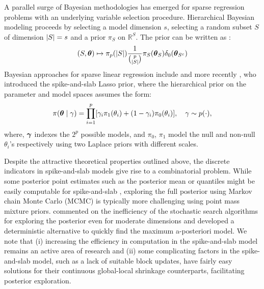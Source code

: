 \documentclass[11pt]{article}
\begin{document}
A parallel surge of Bayesian methodologies has emerged for sparse regression
problems with an underlying variable selection procedure. Hierarchical Bayesian
modeling proceeds by selecting a model dimension $s$, selecting a random subset
$S$ of dimension $\lvert S\rvert = s$ and a prior $\pi_S$ on $\mathbb{R}^{S}$. The
prior can be written as \cite{castillo2015bayesian}:
\begin{equation}
  (S,\boldsymbol{\theta}) \mapsto \pi_p(\lvert S\rvert) \frac{1}{\binom{p}{\lvert S\rvert}}
  \pi_S(\boldsymbol{\theta}_S)\delta_{0}(\boldsymbol{\theta}_{S^c}) \label{eq:bayes-hier}
\end{equation}
Bayesian approaches for sparse linear regression include
\citep{george2000variable,George0000, mitchell88, ishwaran2005spike} and more
recently \cite{rovckova2016spike}, who introduced the spike-and-slab Lasso
prior, where the hierarchical prior on the parameter and model spaces assumes
the form:
\begin{equation}
  \pi(\boldsymbol{\theta} \mid \gamma) = \prod_{i=1}^{p} [\gamma_i \pi_1(\theta_i) +
  (1-\gamma_i) \pi_0(\theta_i)], \quad \gamma \sim p(\cdot), \label{eq:ssl}
\end{equation}
where, $\boldsymbol{\gamma}$ indexes the $2^p$ possible models, and $\pi_0$, $\pi_1$ model
the null and non-null $\theta_i$'s respectively using two Laplace priors with
different scales. 

Despite the attractive theoretical properties outlined above, the discrete
indicators in spike-and-slab models give rise to a combinatorial problem. While
some posterior point estimates such as the posterior mean or quantiles might be
easily computable for spike-and-slab \citep{castillo2012needles,
castillo2015bayesian}, exploring the full posterior using Markov chain Monte
Carlo (MCMC) is typically more challenging using point mass mixture priors. 
\citet{rovckova2016spike} commented on the inefficiency of the stochastic
search algorithms for exploring the posterior even for moderate dimensions and
developed a deterministic alternative to quickly find the maximum a-posteriori
model. We note that (i) increasing the efficiency in computation in the
spike-and-slab model remains an active area of research 
\citep[see, e.g., ][]{rovckova2016spike} and (ii) some complicating factors in
the spike-and-slab model, such as a lack of suitable block updates, have fairly
easy solutions for their continuous global-local shrinkage counterparts,
facilitating posterior exploration. 
\end{document}
